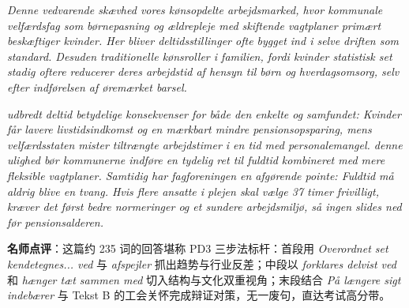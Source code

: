 \begin{answerbox}
\textit{Denne vedvarende skævhed  vores kønsopdelte arbejdsmarked, hvor kommunale velfærdsfag som børnepasning og ældrepleje med skiftende vagtplaner primært beskæftiger kvinder. Her bliver deltidsstillinger ofte bygget ind i selve driften som standard. Desuden  traditionelle kønsroller i familien, fordi kvinder statistisk set stadig oftere reducerer deres arbejdstid af hensyn til børn og hverdagsomsorg, selv efter indførelsen af øremærket barsel.}

\textit{ udbredt deltid betydelige konsekvenser for både den enkelte og samfundet: Kvinder får lavere livstidsindkomst og en mærkbart mindre pensionsopsparing, mens velfærdsstaten mister tiltrængte arbejdstimer i en tid med personalemangel.  denne ulighed bør kommunerne indføre en tydelig ret til fuldtid kombineret med mere fleksible vagtplaner. Samtidig har fagforeningen en afgørende pointe: Fuldtid må aldrig blive en tvang. Hvis flere ansatte i plejen skal vælge 37 timer frivilligt, kræver det først bedre normeringer og et sundere arbejdsmiljø, så ingen slides ned før pensionsalderen.}

\small\textbf{名师点评}：这篇约 235 词的回答堪称 PD3 三步法标杆：首段用 \textit{Overordnet set kendetegnes... ved} 与 \textit{afspejler} 抓出趋势与行业反差；中段以 \textit{forklares delvist ved} 和 \textit{hænger tæt sammen med} 切入结构与文化双重视角；末段结合 \textit{På længere sigt indebærer} 与 Tekst B 的工会关怀完成辩证对策，无一废句，直达考试高分带。
\end{answerbox}
